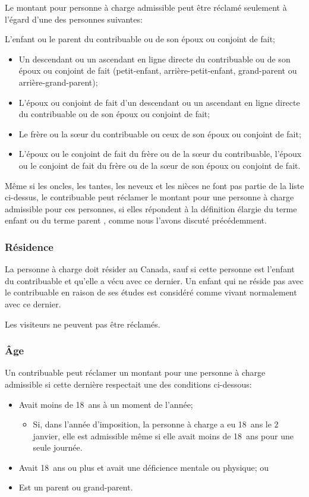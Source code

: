 Le montant pour personne à charge admissible peut être réclamé seulement à l'égard d'une des personnes suivantes:

L'enfant ou le parent du contribuable ou de son époux ou conjoint de fait;
\begin{itemize}
	\item Un descendant ou un ascendant en ligne directe du contribuable ou de son époux ou conjoint de fait (petit-enfant, arrière-petit-enfant, grand-parent ou arrière-grand-parent);
	\item L'époux ou conjoint de fait d'un descendant ou un ascendant en ligne directe du contribuable ou de son époux ou conjoint de fait;
	\item Le frère ou la sœur du contribuable ou ceux de son époux ou conjoint de fait;
	\item L'époux ou le conjoint de fait du frère ou de la sœur du contribuable, l'époux ou le conjoint de fait du frère ou de la sœur de son époux ou conjoint de fait.
\end{itemize}

Même si les oncles, les tantes, les neveux et les nièces ne font pas partie de la liste ci-dessus, le contribuable peut réclamer le montant pour une personne à charge admissible pour ces personnes, si elles répondent à la définition élargie du terme \og enfant \fg{} ou du terme \og parent \fg{}, comme nous l'avons discuté précédemment.

\subsubsection{Résidence}
La personne à charge doit résider au Canada, sauf si cette personne est l'enfant du contribuable et qu'elle a vécu avec ce dernier. Un enfant qui ne réside pas avec le contribuable en raison de ses études est considéré comme vivant normalement avec ce dernier.

Les visiteurs ne peuvent pas être réclamés.

\subsubsection{Âge}
Un contribuable peut réclamer un montant pour une personne à charge admissible si cette dernière respectait une des conditions ci-dessous:
\begin{itemize}
	\item Avait moins de 18~ans à un moment de l'année;
	\begin{itemize}
		\item Si, dans l'année d'imposition, la personne à charge a eu 18~ans le 2 janvier, elle est admissible même si elle avait moins de 18~ans pour une seule journée.
	\end{itemize}
	\item Avait 18~ans ou plus et avait une déficience mentale ou physique; ou
	\item Est un parent ou grand-parent.
\end{itemize}

